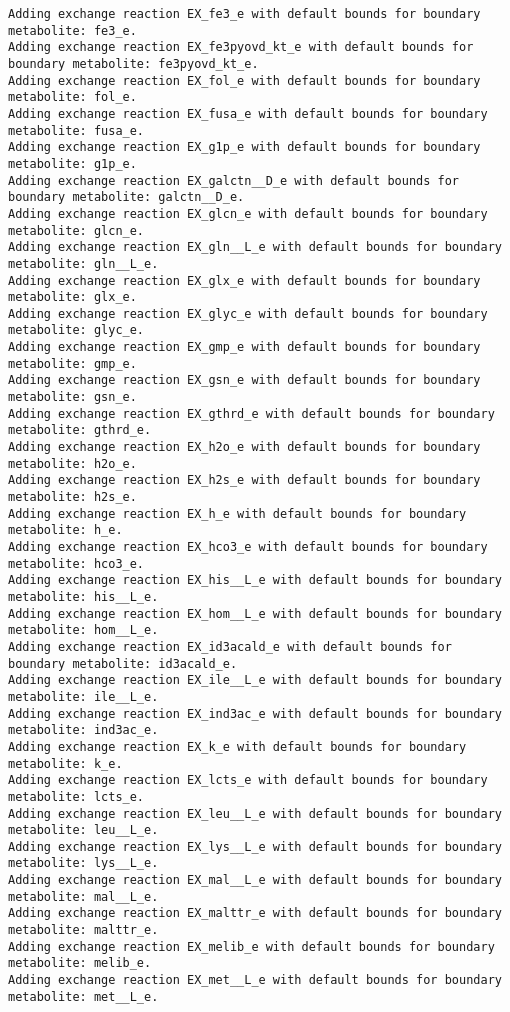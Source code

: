 \documentclass[
  letterpaper,
  DIV=11,
  numbers=noendperiod]{scrartcl}
\begin{document}
\begin{verbatim}
Adding exchange reaction EX_fe3_e with default bounds for boundary metabolite: fe3_e.
Adding exchange reaction EX_fe3pyovd_kt_e with default bounds for boundary metabolite: fe3pyovd_kt_e.
Adding exchange reaction EX_fol_e with default bounds for boundary metabolite: fol_e.
Adding exchange reaction EX_fusa_e with default bounds for boundary metabolite: fusa_e.
Adding exchange reaction EX_g1p_e with default bounds for boundary metabolite: g1p_e.
Adding exchange reaction EX_galctn__D_e with default bounds for boundary metabolite: galctn__D_e.
Adding exchange reaction EX_glcn_e with default bounds for boundary metabolite: glcn_e.
Adding exchange reaction EX_gln__L_e with default bounds for boundary metabolite: gln__L_e.
Adding exchange reaction EX_glx_e with default bounds for boundary metabolite: glx_e.
Adding exchange reaction EX_glyc_e with default bounds for boundary metabolite: glyc_e.
Adding exchange reaction EX_gmp_e with default bounds for boundary metabolite: gmp_e.
Adding exchange reaction EX_gsn_e with default bounds for boundary metabolite: gsn_e.
Adding exchange reaction EX_gthrd_e with default bounds for boundary metabolite: gthrd_e.
Adding exchange reaction EX_h2o_e with default bounds for boundary metabolite: h2o_e.
Adding exchange reaction EX_h2s_e with default bounds for boundary metabolite: h2s_e.
Adding exchange reaction EX_h_e with default bounds for boundary metabolite: h_e.
Adding exchange reaction EX_hco3_e with default bounds for boundary metabolite: hco3_e.
Adding exchange reaction EX_his__L_e with default bounds for boundary metabolite: his__L_e.
Adding exchange reaction EX_hom__L_e with default bounds for boundary metabolite: hom__L_e.
Adding exchange reaction EX_id3acald_e with default bounds for boundary metabolite: id3acald_e.
Adding exchange reaction EX_ile__L_e with default bounds for boundary metabolite: ile__L_e.
Adding exchange reaction EX_ind3ac_e with default bounds for boundary metabolite: ind3ac_e.
Adding exchange reaction EX_k_e with default bounds for boundary metabolite: k_e.
Adding exchange reaction EX_lcts_e with default bounds for boundary metabolite: lcts_e.
Adding exchange reaction EX_leu__L_e with default bounds for boundary metabolite: leu__L_e.
Adding exchange reaction EX_lys__L_e with default bounds for boundary metabolite: lys__L_e.
Adding exchange reaction EX_mal__L_e with default bounds for boundary metabolite: mal__L_e.
Adding exchange reaction EX_malttr_e with default bounds for boundary metabolite: malttr_e.
Adding exchange reaction EX_melib_e with default bounds for boundary metabolite: melib_e.
Adding exchange reaction EX_met__L_e with default bounds for boundary metabolite: met__L_e.

\end{verbatim}
\end{document}
